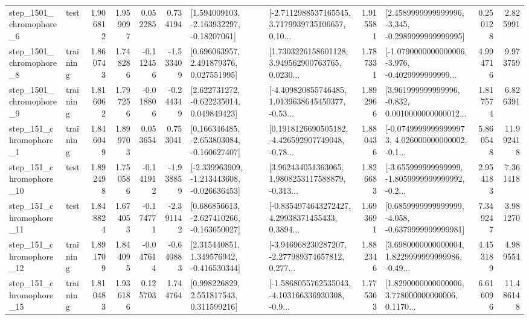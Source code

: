 \begin{tabular}{llrrrrllrlrr}
  step\_1501\_chromophore\_6 &      test &      1.906812 &    1.959097 &      0.052285 &  0.734194 &    [1.594009103, -2.163932297, -0.18207061] &  [-2.7112988537165545, 3.7179939735106657, 0.10... &       1.915581 &  [2.4589999999999996, -3.345, -0.2989999999999995] &            0.250128 &          2.825991 \\
  step\_1501\_chromophore\_8 &  training &      1.860743 &    1.748286 &     -0.112456 & -1.533409 &     [0.696063957, 2.491879376, 0.027551995] &  [1.7303226158601128, 3.949562900763765, 0.0230... &       1.787331 &  [-1.0790000000000006, -3.976, -0.4029999999999... &            4.994716 &          9.973759 \\
  step\_1501\_chromophore\_9 &  training &      1.816062 &    1.797256 &     -0.018806 & -0.244349 &    [2.622731272, -0.622235014, 0.049849423] &  [-4.409820855746485, 1.0139638645450377, -0.53... &       1.892966 &  [3.961999999999996, -0.832, 0.0010000000000012... &            1.817574 &          6.826391 \\
   step\_151\_chromophore\_1 &  training &      1.846049 &    1.899703 &      0.053654 &  0.753041 &   [0.166346485, -2.653803084, -0.160627407] &  [0.1918126690505182, -4.426592907749048, -0.78... &       1.880436 &  [-0.07499999999999973, 4.026000000000002, -0.1... &            5.860548 &         11.992418 \\
  step\_151\_chromophore\_10 &      test &      1.892498 &    1.750586 &     -0.141912 & -1.938859 &  [-2.339963909, -1.213443608, -0.026636453] &  [3.962434051363065, 1.9808253117588879, -0.313... &       1.826683 &  [-3.655999999999999, -1.8059999999999992, -0.2... &            2.954183 &          7.361418 \\
  step\_151\_chromophore\_11 &      test &      1.848824 &    1.674053 &     -0.174771 & -2.391142 &   [0.686856613, -2.627410266, -0.163650027] &  [-0.8354974643272427, 4.29938371455433, 0.3894... &       1.693691 &  [0.6859999999999999, -4.058, -0.6379999999999981] &            7.349247 &          3.981270 \\
  step\_151\_chromophore\_12 &  training &      1.891709 &    1.844095 &     -0.047614 & -0.640883 &    [2.315440851, 1.349576942, -0.416530344] &  [-3.946968230287207, -2.277989374657812, 0.277... &       1.882346 &  [3.6980000000000004, 1.8229999999999986, -0.49... &            4.453189 &          4.989554 \\
  step\_151\_chromophore\_15 &  training &      1.810483 &    1.936186 &      0.125703 &  1.744764 &     [0.998226829, 2.551817543, 0.311599216] &  [-1.5868055762535043, -4.103166336930308, -0.9... &       1.775363 &  [1.8290000000000006, 3.778000000000006, 0.1170... &            6.616096 &         11.486148 \\

\end{tabular}
